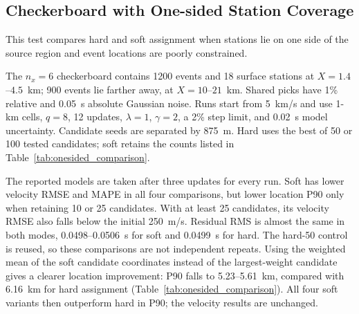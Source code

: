 \subsection{Checkerboard with One-sided Station Coverage}
\label{subsec:onesided_results}

This test compares hard and soft assignment when stations lie on one side of the source region and event locations are poorly constrained.

The $n_x=6$ checkerboard contains 1200 events and 18 surface stations at $X=1.4$--$4.5$~km; 900 events lie farther away, at $X=10$--$21$~km. Shared picks have 1\% relative and 0.05~s absolute Gaussian noise. Runs start from 5~km/s and use 1-km cells, $q=8$, 12 updates, $\lambda=1$, $\gamma=2$, a 2\% step limit, and 0.02~s model uncertainty. Candidate seeds are separated by 875~m. Hard uses the best of 50 or 100 tested candidates; soft retains the counts listed in Table~\ref{tab:onesided_comparison}.

The reported models are taken after three updates for every run. Soft has lower velocity RMSE and MAPE in all four comparisons, but lower location P90 only when retaining 10 or 25 candidates. With at least 25 candidates, its velocity RMSE also falls below the initial 250~m/s. Residual RMS is almost the same in both modes, 0.0498--0.0506~s for soft and 0.0499~s for hard. The hard-50 control is reused, so these comparisons are not independent repeats. Using the weighted mean of the soft candidate coordinates instead of the largest-weight candidate gives a clearer location improvement: P90 falls to 5.23--5.61~km, compared with 6.16~km for hard assignment (Table~\ref{tab:onesided_comparison}). All four soft variants then outperform hard in P90; the velocity results are unchanged.

